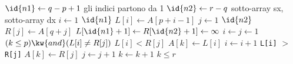 \begin{codebox}
    \li $\id{n1} \gets q-p+1$
        \Comment gli indici partono da 1
    \li $\id{n2} \gets r-q$
    \zi \Comment {} sotto-array sx,  sotto-array dx
    \li \For $i \gets 1$ \To $\id{n1}$
    \li     \Do
                $L[i] \gets A[p+i-1]$
            \End
    \li	\For $j \gets 1$ \To $\id{n2}$
    \li		\Do
                $R[j] \gets A[q+j]$
            \End
    \li         $L[\id{n1}+1] \gets R[\id{n2}+1] \gets \infty$
    \li         $i \gets j \gets 1$
    \li         \While $(k \leq p) \kw{ and } (L[i] \neq R[j])$ 
    \li             \Do
                        \If $L[i] < R[j]$
    \li                     \Then
                                $A[k] \gets L[i]$
    \li                         $i \gets i+1$
    \li                     \Else
                        \Comment \texttt{L[i]} $>$ \texttt{R[j]}
    \li                            $A[k] \gets R[j]$
    \li                         $j \gets j+1$
                            \End
    \li                 $k \gets k+1$
                    \End
    \li         \Return $k \leq r$
\end{codebox}
